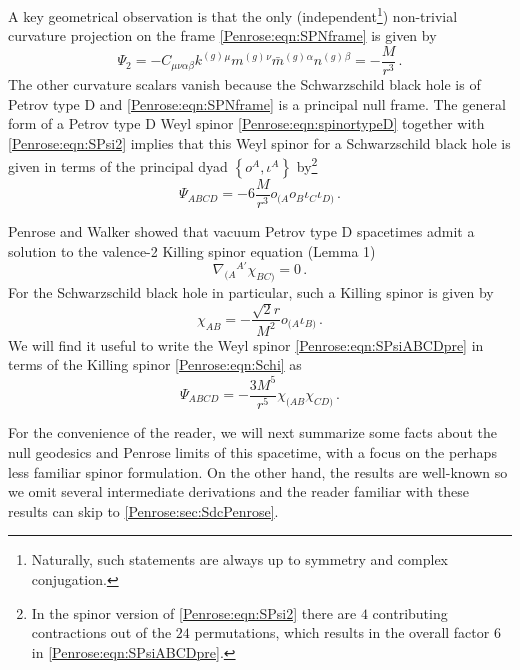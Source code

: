 A key geometrical observation is that the only (independent\footnote{Naturally, such statements are always up to symmetry and complex conjugation.}) non-trivial curvature projection on the frame \eqref{Penrose:eqn:SPNframe} is given by
\begin{equation}\label{Penrose:eqn:SPsi2}
\Psi_2 = -C_{\mu \nu \alpha \beta} k^{(g)}{}^{\mu} m^{(g)}{}^{\nu}\bar{m}^{(g)}{}^{\alpha} n^{(g)}{}^{\beta}= -\frac{M}{r^3} \, .
\end{equation}
The other curvature scalars vanish because the Schwarzschild black hole is of Petrov type D and
\eqref{Penrose:eqn:SPNframe} is a principal null frame. The general form of a Petrov type D Weyl spinor
\eqref{Penrose:eqn:spinortypeD} together with \eqref{Penrose:eqn:SPsi2} implies that this Weyl spinor for a Schwarzschild black
hole is given in terms of the principal dyad $\left\lbrace o^A, \iota^A \right\rbrace$ by\footnote{In the spinor version of \eqref{Penrose:eqn:SPsi2} there are $4$ contributing contractions out of the $24$ permutations, which results in the overall factor $6$ in \eqref{Penrose:eqn:SPsiABCDpre}.}
\begin{equation}\label{Penrose:eqn:SPsiABCDpre}
\Psi_{ABCD} = -6 \frac{M}{r^3} o_{(A} o_B \iota_C \iota_{D)} \, .
\end{equation}

Penrose and Walker showed that vacuum Petrov type D spacetimes admit a solution to the valence-2 Killing spinor equation \cite{Walker:1970un} (Lemma 1)
\begin{equation}\label{Penrose:eqn:valence2}
	\nabla_{(A}{}^{A'} \chi_{BC)} = 0 \, .
\end{equation}
For the Schwarzschild black hole in particular, such a Killing spinor is given by
\begin{equation}\label{Penrose:eqn:Schi}
	 \chi_{AB} =  -\frac{\sqrt{2} r}{M^2} o_{(A} \iota_{B)} \, .
\end{equation}
We will find it useful to write the Weyl spinor \eqref{Penrose:eqn:SPsiABCDpre} in terms of the Killing spinor \eqref{Penrose:eqn:Schi} as
\begin{equation}\label{Penrose:eqn:SPsiABCD}
\Psi_{ABCD} = -\frac{3 M^5}{r^5} \chi_{(AB}\chi_{CD)} \, . 
\end{equation}

For the convenience of the reader, we will next summarize some facts about the null geodesics and Penrose limits of this spacetime, with a focus on the perhaps less familiar spinor formulation. On the other hand, the results are well-known \cite{blau2011plane} so we omit several intermediate derivations and the reader familiar with these results can skip to \ref{Penrose:sec:SdcPenrose}.

